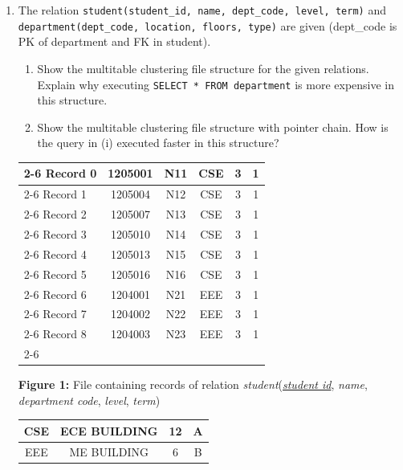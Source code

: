 \documentclass[12pt]{article}
\begin{document}
\begin{enumerate}
\item The relation \texttt{student(student\_id, name, dept\_code, level, term)} and \texttt{department(dept\_code, location, floors, type)} are given (dept\_code is PK of department and FK in student).
\begin{enumerate}
  \item Show the multitable clustering file structure for the given relations. Explain why executing \texttt{SELECT * FROM department} is more expensive in this structure.
  \item Show the multitable clustering file structure with pointer chain. How is the query in (i) executed faster in this structure?
\end{enumerate}

\begin{center}
  \renewcommand{\arraystretch}{1.3} %
    \begin{tabular}{l |c|c|c|c|c|}
        \cline{2-6}
        Record 0 & 1205001 & N11 & CSE & 3 & 1 \\
        \cline{2-6}
        Record 1 & 1205004 & N12 & CSE & 3 & 1 \\
        \cline{2-6}
        Record 2 & 1205007 & N13 & CSE & 3 & 1 \\
        \cline{2-6}
        Record 3 & 1205010 & N14 & CSE & 3 & 1 \\
        \cline{2-6}
        Record 4 & 1205013 & N15 & CSE & 3 & 1 \\
        \cline{2-6}
        Record 5 & 1205016 & N16 & CSE & 3 & 1 \\
        \cline{2-6}
        Record 6 & 1204001 & N21 & EEE & 3 & 1 \\
        \cline{2-6}
        Record 7 & 1204002 & N22 & EEE & 3 & 1 \\
        \cline{2-6}
        Record 8 & 1204003 & N23 & EEE & 3 & 1 \\
        \cline{2-6}
    \end{tabular}
    
    \vspace{0.4cm}
    \textbf{Figure 1:} File containing records of relation \textit{student}(\underline{\textit{student id}}, \textit{name}, \textit{department code}, \textit{level}, \textit{term})

\vspace{1cm}

    \renewcommand{\arraystretch}{1.3}
    \begin{tabular}{|c|c|c|c|}
        \hline
        CSE & ECE BUILDING & 12 & A \\
        \hline
        EEE & ME BUILDING & 6 & B \\
        \hline
    \end{tabular}
    

\end{center}
\end{enumerate}
\end{document}
